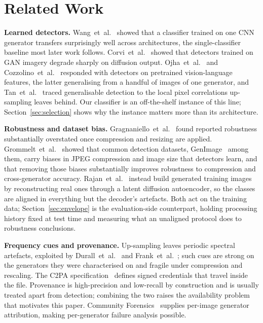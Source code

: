 \documentclass[conference]{IEEEtran}
\begin{document}
\section{Related Work}

\textbf{Learned detectors.} Wang~et~al.~\cite{wang2020} showed that a
classifier trained on one CNN generator transfers surprisingly well across
architectures, the single-classifier baseline most later work follows.
Corvi~et~al.~\cite{corvi2023} showed that detectors trained on GAN imagery
degrade sharply on diffusion output. Ojha~et~al.~\cite{ojha2023} and
Cozzolino~et~al.~\cite{cozzolino2024} responded with detectors on pretrained
vision-language features, the latter generalising from a handful of images of
one generator, and Tan~et~al.~\cite{tan2024} traced generalisable detection to
the local pixel correlations up-sampling leaves behind. Our classifier is an
off-the-shelf instance of this line; Section~\ref{sec:selection} shows why the
instance matters more than its architecture.

\textbf{Robustness and dataset bias.} Gragnaniello~et~al.~\cite{gragnaniello2021}
found reported robustness substantially overstated once compression and
resizing are applied. Grommelt~et~al.~\cite{grommelt2024} showed that common
detection datasets, GenImage~\cite{zhu2023} among them, carry biases in JPEG
compression and image size that detectors learn, and that removing those biases
substantially improves robustness to compression and cross-generator accuracy.
Rajan~et~al.~\cite{rajan2025} instead build generated training images by
reconstructing real ones through a latent diffusion autoencoder, so the classes
are aligned in everything but the decoder's artefacts. Both act on the training
data; Section~\ref{sec:envelope} is the evaluation-side counterpart, holding
processing history fixed at test time and measuring what an unaligned protocol
does to robustness conclusions.

\textbf{Frequency cues and provenance.} Up-sampling leaves periodic spectral
artefacts, exploited by Durall~et~al.~\cite{durall2020} and
Frank~et~al.~\cite{frank2020}; such cues are strong on the generators they were
characterised on and fragile under compression and rescaling. The C2PA
specification~\cite{c2pa} defines signed credentials that travel inside the
file. Provenance is high-precision and low-recall by construction and is
usually treated apart from detection; combining the two raises the
availability problem that motivates this paper. Community
Forensics~\cite{park2025} supplies per-image generator attribution, making
per-generator failure analysis possible.
\end{document}
